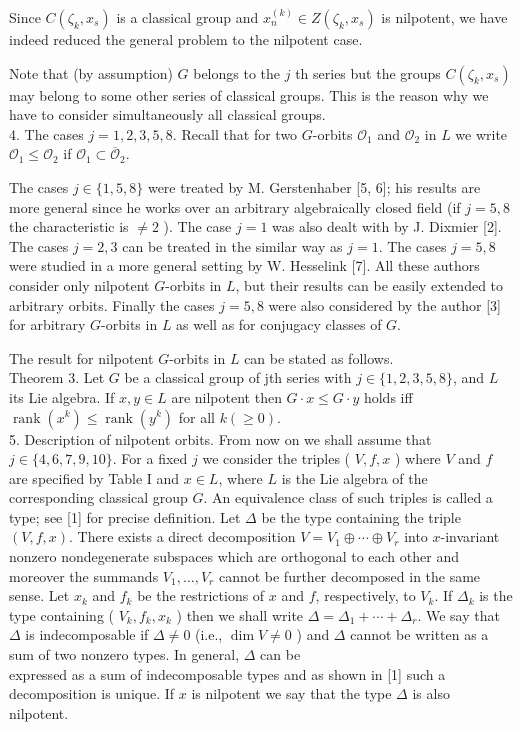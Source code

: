 \documentclass[10pt]{article}
\begin{document}
Since $C\left(\zeta_{k}, x_{s}\right)$ is a classical group and $x_{n}^{(k)} \in Z\left(\zeta_{k}, x_{s}\right)$ is nilpotent, we have indeed reduced the general problem to the nilpotent case.

Note that (by assumption) $G$ belongs to the $j$ th series but the groups $C\left(\zeta_{k}, x_{s}\right)$ may belong to some other series of classical groups. This is the reason why we have to consider simultaneously all classical groups.\\
4. The cases $j=1,2,3,5,8$. Recall that for two $G$-orbits $\mathcal{O}_{1}$ and $\mathcal{O}_{2}$ in $L$ we write $\mathcal{O}_{1} \leqslant \mathcal{O}_{2}$ if $\mathcal{O}_{1} \subset \overline{\mathcal{O}}_{2}$.

The cases $j \in\{1,5,8\}$ were treated by M. Gerstenhaber [5, 6]; his results are more general since he works over an arbitrary algebraically closed field (if $j=5,8$ the characteristic is $\neq 2$ ). The case $j=1$ was also dealt with by J. Dixmier [2]. The cases $j=2,3$ can be treated in the similar way as $j=1$. The cases $j=5,8$ were studied in a more general setting by W. Hesselink [7]. All these authors consider only nilpotent $G$-orbits in $L$, but their results can be easily extended to arbitrary orbits. Finally the cases $j=5,8$ were also considered by the author [3] for arbitrary $G$-orbits in $L$ as well as for conjugacy classes of $G$.

The result for nilpotent $G$-orbits in $L$ can be stated as follows.\\
Theorem 3. Let $G$ be a classical group of jth series with $j \in\{1,2,3,5,8\}$, and $L$ its Lie algebra. If $x, y \in L$ are nilpotent then $G \cdot x \leqslant G \cdot y$ holds iff $\operatorname{rank}\left(x^{k}\right) \leqslant \operatorname{rank}\left(y^{k}\right)$ for all $k(\geqslant 0)$.\\
5. Description of nilpotent orbits. From now on we shall assume that $j \in\{4,6,7,9,10\}$. For a fixed $j$ we consider the triples ( $V, f, x$ ) where $V$ and $f$ are specified by Table I and $x \in L$, where $L$ is the Lie algebra of the corresponding classical group $G$. An equivalence class of such triples is called a type; see [1] for precise definition. Let $\Delta$ be the type containing the triple $(V, f, x)$. There exists a direct decomposition $V=V_{1} \oplus \cdots \oplus V_{r}$ into $x$-invariant nonzero nondegenerate subspaces which are orthogonal to each other and moreover the summands $V_{1}, \ldots, V_{r}$ cannot be further decomposed in the same sense. Let $x_{k}$ and $f_{k}$ be the restrictions of $x$ and $f$, respectively, to $V_{k}$. If $\Delta_{k}$ is the type containing ( $V_{k}, f_{k}, x_{k}$ ) then we shall write $\Delta=\Delta_{1}+\cdots+\Delta_{r}$. We say that $\Delta$ is indecomposable if $\Delta \neq 0$ (i.e., $\operatorname{dim} V \neq 0$ ) and $\Delta$ cannot be written as a sum of two nonzero types. In general, $\Delta$ can be\\[0pt]
expressed as a sum of indecomposable types and as shown in [1] such a decomposition is unique. If $x$ is nilpotent we say that the type $\Delta$ is also nilpotent.
\end{document}
